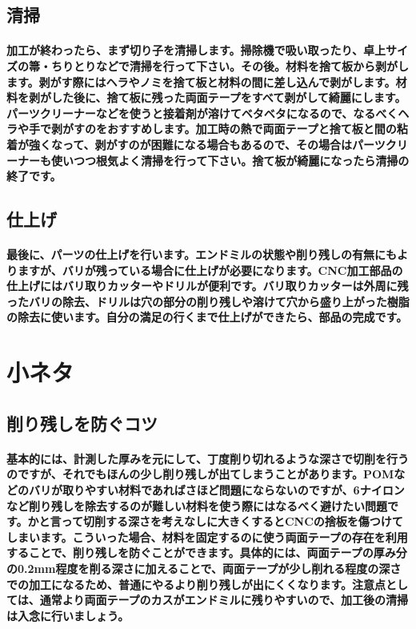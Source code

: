 \documentclass[b5paper, 9pt, twocolumn, titlepage,openany]{jsbook}%
\begin{document}
\subsection{清掃}
\paragraph{加工が終わったら、まず切り子を清掃します。掃除機で吸い取ったり、卓上サイズの箒・ちりとりなどで清掃を行って下さい。その後。材料を捨て板から剥がします。剥がす際にはヘラやノミを捨て板と材料の間に差し込んで剥がします。材料を剥がした後に、捨て板に残った両面テープをすべて剥がして綺麗にします。パーツクリーナーなどを使うと接着剤が溶けてベタベタになるので、なるべくヘラや手で剥がすのをおすすめします。加工時の熱で両面テープと捨て板と間の粘着が強くなって、剥がすのが困難になる場合もあるので、その場合はパーツクリーナーも使いつつ根気よく清掃を行って下さい。捨て板が綺麗になったら清掃の終了です。}

\subsection{仕上げ}
\paragraph{最後に、パーツの仕上げを行います。エンドミルの状態や削り残しの有無にもよりますが、バリが残っている場合に仕上げが必要になります。CNC加工部品の仕上げにはバリ取りカッターやドリルが便利です。バリ取りカッターは外周に残ったバリの除去、ドリルは穴の部分の削り残しや溶けて穴から盛り上がった樹脂の除去に使います。自分の満足の行くまで仕上げができたら、部品の完成です。}

\section{小ネタ}
\subsection{削り残しを防ぐコツ}
\paragraph{基本的には、計測した厚みを元にして、丁度削り切れるような深さで切削を行うのですが、それでもほんの少し削り残しが出てしまうことがあります。POMなどのバリが取りやすい材料であればさほど問題にならないのですが、6ナイロンなど削り残しを除去するのが難しい材料を使う際にはなるべく避けたい問題です。かと言って切削する深さを考えなしに大きくするとCNCの捨板を傷つけてしまいます。こういった場合、材料を固定するのに使う両面テープの存在を利用することで、削り残しを防ぐことができます。具体的には、両面テープの厚み分の0.2mm程度を削る深さに加えることで、両面テープが少し削れる程度の深さでの加工になるため、普通にやるより削り残しが出にくくなります。注意点としては、通常より両面テープのカスがエンドミルに残りやすいので、加工後の清掃は入念に行いましょう。}
\end{document}
